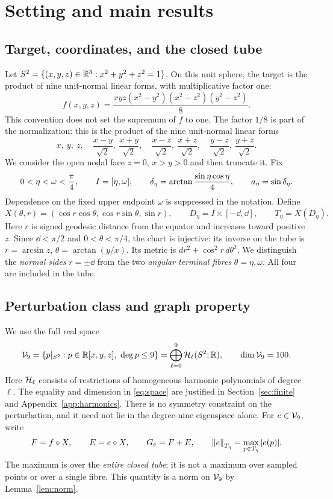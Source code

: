 \documentclass[11pt,a4paper]{article}
\begin{document}
\section{Setting and main results}\label{sec:problem}

\subsection{Target, coordinates, and the closed tube}
Let $S^2=\{(x,y,z)\in\mathbb R^3:x^2+y^2+z^2=1\}$. On this unit sphere,
the target is the product of nine unit-normal linear forms,
with multiplicative factor one:
\begin{equation}\label{eq:target}
 f(x,y,z)=\frac{xyz(x^2-y^2)(x^2-z^2)(y^2-z^2)}{8}.
\end{equation}
This convention does not set the supremum of $f$ to one.
The factor $1/8$ is part of the normalization: this is the product
of the nine unit-normal linear forms
\[
 x,\ y,\ z,\quad
 \frac{x-y}{\sqrt2},\ \frac{x+y}{\sqrt2},\quad
 \frac{x-z}{\sqrt2},\ \frac{x+z}{\sqrt2},\quad
 \frac{y-z}{\sqrt2},\ \frac{y+z}{\sqrt2}.
\]
We consider the open nodal face $z=0$, $x>y>0$ and then truncate it.
Fix
\begin{equation}\label{eq:domain}
 0<\eta<\omega<\frac{\pi}{4},\qquad
 I=[\eta,\omega],\qquad
 \delta_\eta=\arctan\frac{\sin\eta\cos\eta}{4},\qquad
 a_\eta=\sin\delta_\eta.
\end{equation}
Dependence on the fixed upper endpoint $\omega$ is suppressed in the
notation. Define
\begin{equation}\label{eq:chart}
 X(\theta,r)=(\cos r\cos\theta,\cos r\sin\theta,\sin r),\qquad
 D_\eta=I\times[-\dd,\dd],\qquad T_\eta=X(D_\eta).
\end{equation}
Here $r$ is signed geodesic distance from the equator and increases toward
positive $z$. Since $\dd<\pi/2$ and $0<\theta<\pi/4$, the chart is
injective: its inverse on the tube is
$r=\arcsin z$, $\theta=\arctan(y/x)$. Its metric is
$dr^2+\cos^2r\,d\theta^2$. We distinguish the \emph{normal sides}
$r=\pm\dd$ from the two \emph{angular terminal fibres}
$\theta=\eta,\omega$. All four are included in the tube.

\subsection{Perturbation class and graph property}
We use the full real space
\begin{equation}\label{eq:space}
 \mathcal V_9=\{p|_{S^2}:p\in\mathbb R[x,y,z],\ \deg p\le9\}
     =\bigoplus_{\ell=0}^{9}\mathcal H_\ell(S^2;\mathbb R),
 \qquad \dim\mathcal V_9=100.
\end{equation}
Here $\mathcal H_\ell$ consists of restrictions of homogeneous harmonic
polynomials of degree $\ell$. The equality and dimension in
\eqref{eq:space} are justified in Section~\ref{sec:finite} and
Appendix~\ref{app:harmonics}. There is no symmetry constraint on the
perturbation, and it need not lie in the degree-nine eigenspace alone.
For $e\in\mathcal V_9$, write
\[
 F=f\circ X,\qquad E=e\circ X,\qquad G_e=F+E,\qquad
 \left\lVert e\right\rVert_{T_\eta}=\max_{p\in T_\eta}|e(p)|.
\]
The maximum is over the \emph{entire closed tube}; it is not a maximum
over sampled points or over a single fibre. This quantity is a norm on
$\mathcal V_9$ by Lemma~\ref{lem:norm}.
\end{document}
